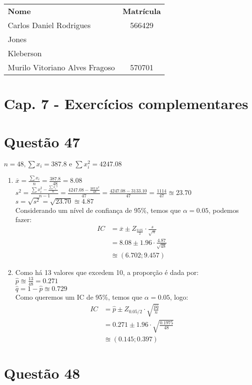 \documentclass[12pt]{article}
\newcommand{\quest}[1]{\section*{Questão #1}} %
\begin{document}
\begin{table}[]
\centering
\begin{tabular}{lc}
\hline
\textbf{Nome}                  & \textbf{Matrícula}\\
Carlos Daniel Rodrigues        &  566429           \\
Jones                          &                   \\
Kleberson                      &                   \\
Murilo Vitoriano Alves Fragoso & 570701            \\ \hline
\end{tabular}
\end{table}

\section{Cap. 7 - Exercícios complementares}
\quest{47}
$n = 48, \sum{x_i}= 387.8 \text{ e } \sum{x_i^2=4247.08}$ 
\begin{enumerate}
    \item $\overline{x} = \frac{\sum{x_i}}{n} = \frac{387.8}{48} = 8.08$\\
          $s^2 = \frac{\sum{x_i^2} - \frac{\sum{x_i}^2}{n}}{n-1} = \frac{4247.08 - \frac{387.8^2}{48}}{47} = \frac{4247.08-3133.10}{47} = \frac{1114}{47} \approxeq 23.70$\\
          $s = \sqrt{s^2} = \sqrt{23.70} \approxeq 4.87$\\
          Considerando um nível de confiança de 95\%, temos que $\alpha = 0.05$, podemos fazer:
          \begin{align*}
              IC &= \overline{x} \pm Z_{\frac{0.05}{2}} \cdot \frac{s}{\sqrt{n}}\\
                 &= 8.08 \pm 1.96 \cdot \frac{4.87}{\sqrt{48}}\\
                 &\approxeq \left (6.702; 9.457 \right)
          \end{align*}
    \item Como há 13 valores que excedem 10, a proporção é dada por:\\
    $\hat{p} \approxeq \frac{13}{48} = 0.271$\\
    $\hat{q} = 1 - \hat{p} \approxeq 0.729$\\
    Como queremos um IC de 95\%, temos que $\alpha = 0.05$, logo:
    \begin{align*}
        IC &= \hat{p} \pm Z_{0.05/2} \cdot \sqrt{\frac{\hat{p}\hat{q}}{n}}\\
            &= 0.271 \pm 1.96 \cdot \sqrt{\frac{0.1975}{48}}\\
            &\approxeq (0.145;0.397)
    \end{align*}
\end{enumerate}

\quest{48}
\end{document}
